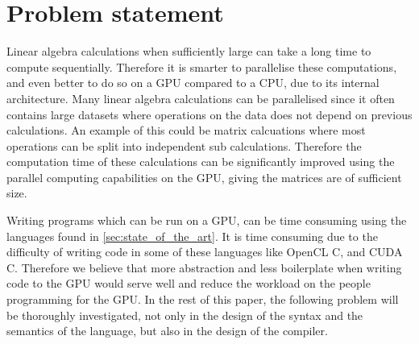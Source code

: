 \newpage
\section{Problem statement}

Linear algebra calculations when sufficiently large can take a long time to compute sequentially. 
Therefore it is smarter to parallelise these computations, and even better to do so on a GPU compared to a CPU, due to its internal architecture.
Many linear algebra calculations can be parallelised since it often contains large datasets where operations on the data does not depend on previous calculations.
An example of this could be matrix calcuations where most operations can be split into independent sub calculations.
Therefore the computation time of these calculations can be significantly improved using the parallel computing capabilities on the GPU, giving the matrices are of sufficient size.

Writing programs which can be run on a GPU, can be time consuming using the languages found in \ref{sec:state_of_the_art}.
It is time consuming due to the difficulty of writing code in some of these languages like OpenCL C, and CUDA C.
Therefore we believe that more abstraction and less boilerplate when writing code to the GPU would serve well and reduce the workload on the people programming for the GPU.
In the rest of this paper, the following problem will be thoroughly investigated, not only in the design of the syntax and the semantics of the language, but also in the design of the compiler.

